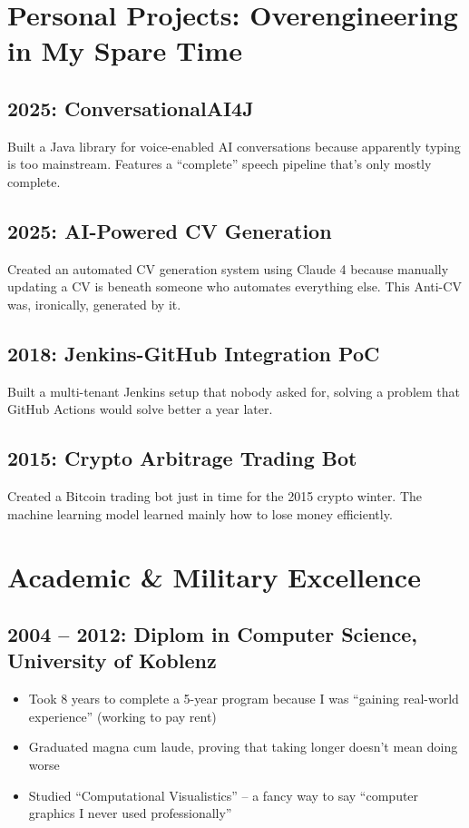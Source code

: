 \documentclass[10pt,a4paper]{article}
\begin{document}
\section*{Personal Projects: Overengineering in My Spare Time}

\subsection*{2025: ConversationalAI4J}
Built a Java library for voice-enabled AI conversations because apparently typing is too mainstream. Features a ``complete'' speech pipeline that's only mostly complete.

\subsection*{2025: AI-Powered CV Generation}
Created an automated CV generation system using Claude 4 because manually updating a CV is beneath someone who automates everything else. This Anti-CV was, ironically, generated by it.

\subsection*{2018: Jenkins-GitHub Integration PoC}
Built a multi-tenant Jenkins setup that nobody asked for, solving a problem that GitHub Actions would solve better a year later.

\subsection*{2015: Crypto Arbitrage Trading Bot}
Created a Bitcoin trading bot just in time for the 2015 crypto winter. The machine learning model learned mainly how to lose money efficiently.

\section*{Academic \& Military Excellence}

\subsection*{2004 -- 2012: Diplom in Computer Science, University of Koblenz}
\begin{itemize}
\item Took 8 years to complete a 5-year program because I was ``gaining real-world experience'' (working to pay rent)
\item Graduated magna cum laude, proving that taking longer doesn't mean doing worse
\item Studied ``Computational Visualistics'' -- a fancy way to say ``computer graphics I never used professionally''
\end{itemize}
\end{document}
